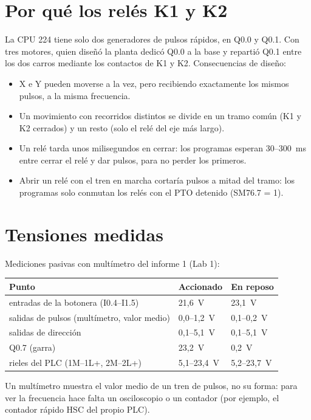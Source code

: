 \section{Por qué los relés K1 y K2}
La CPU 224 tiene solo dos generadores de pulsos rápidos, en Q0.0 y Q0.1. Con tres motores, quien diseñó la planta dedicó Q0.0 a la base y repartió Q0.1 entre los dos carros mediante los contactos de K1 y K2. Consecuencias de diseño:
\begin{itemize}
\item X e Y pueden moverse a la vez, pero recibiendo exactamente los mismos pulsos, a la misma frecuencia.
\item Un movimiento con recorridos distintos se divide en un tramo común (K1 y K2 cerrados) y un resto (solo el relé del eje más largo).
\item Un relé tarda unos milisegundos en cerrar: los programas esperan 30--300~ms entre cerrar el relé y dar pulsos, para no perder los primeros.
\item Abrir un relé con el tren en marcha cortaría pulsos a mitad del tramo: los programas solo conmutan los relés con el PTO detenido (SM76.7 = 1).
\end{itemize}

\section{Tensiones medidas}
Mediciones pasivas con multímetro del informe 1 (Lab 1):
\begin{center}\small
\begin{tabular}{@{}lll@{}}
\toprule
\textbf{Punto} & \textbf{Accionado} & \textbf{En reposo}\\
\midrule
entradas de la botonera (I0.4--I1.5) & 21,6~V & 23,1~V\\
salidas de pulsos (multímetro, valor medio) & 0,0--1,2~V & 0,1--0,2~V\\
salidas de dirección & 0,1--5,1~V & 0,1--5,1~V\\
Q0.7 (garra) & 23,2~V & 0,2~V\\
rieles del PLC (1M--1L+, 2M--2L+) & 5,1--23,4~V & 5,2--23,7~V\\
\bottomrule
\end{tabular}
\end{center}
Un multímetro muestra el valor medio de un tren de pulsos, no su forma: para ver la frecuencia hace falta un osciloscopio o un contador (por ejemplo, el contador rápido HSC del propio PLC).

